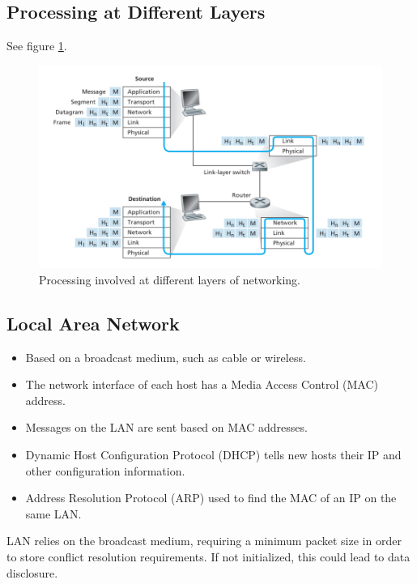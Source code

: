 \documentclass[11pt]{article}
\begin{document}
\subsection{Processing at Different Layers}
See figure \ref{fig:processing}.
\begin{figure}[htb!]
  \centering
  \caption{Processing involved at different layers of networking.}
  \label{fig:processing}
  \includegraphics[scale=0.4]{processing}
\end{figure}

\subsection{Local Area Network}
\begin{itemize}
  \item Based on a broadcast medium, such as cable or wireless.
  \item The network interface of each host has a Media Access Control (MAC) address.
  \item Messages on the LAN are sent based on MAC addresses.
  \item Dynamic Host Configuration Protocol (DHCP) tells new hosts their IP and other configuration information.
  \item Address Resolution Protocol (ARP) used to find the MAC of an IP on the same LAN.
\end{itemize}

LAN relies on the broadcast medium, requiring a minimum packet size in order to store conflict resolution requirements.
If not initialized, this could lead to data disclosure.
\end{document}

